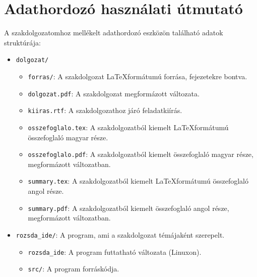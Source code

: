 \chapter*{Adathordozó használati útmutató}



\noindent A szakdolgozatomhoz mellékelt adathordozó eszközön található adatok struktúrája:

\begin{itemize}
    \item \texttt{dolgozat/}
    \begin{itemize}
        \item \texttt{forras/}: A szakdolgozat \LaTeX formátumú forrása, fejezetekre bontva.
        \item \texttt{dolgozat.pdf}: A szakdolgozat megformázott változata.
        \item \texttt{kiiras.rtf}: A szakdolgozathoz járó feladatkiírás.
        \item \texttt{osszefoglalo.tex}: A szakdolgozatból kiemelt \LaTeX formátumú összefoglaló magyar része.
        \item \texttt{osszefoglalo.pdf}: A szakdolgozatból kiemelt összefoglaló magyar része, megformázott változatban.
        \item \texttt{summary.tex}: A szakdolgozatból kiemelt \LaTeX formátumú összefoglaló angol része.
        \item \texttt{summary.pdf}: A szakdolgozatból kiemelt összefoglaló angol része, megformázott változatban.
    \end{itemize}
    \item \texttt{rozsda\_ide/}: A program, ami a szakdolgozat témájaként szerepelt.
    \begin{itemize}
        \item \texttt{rozsda\_ide}: A program futtatható változata (Linuxon).
        \item \texttt{src/}: A program forráskódja.
    \end{itemize}
\end{itemize}